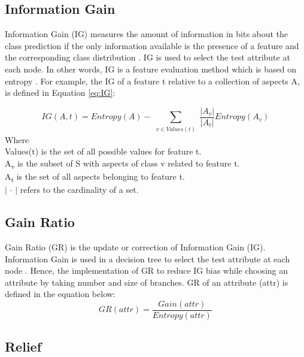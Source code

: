 \documentclass[review]{elsarticle}
\begin{document}
\subsection{Information Gain}
\label{subsec:IG}
Information Gain (IG) measures the amount of information in bits about the class prediction if the only information available is the presence of a feature and the corresponding class distribution \cite{Roobaert}. IG is used to select the test attribute at each node. In other words, IG is a feature evaluation method which is based on entropy \cite{Lei2012}. For example, the IG of a feature t relative to a collection of aspects A, is defined in Equation \ref{eq:IG}: 

\begin{equation}
IG(A,t)=Entropy(A) - \sum_{\substack{v\in Values(t)}} \dfrac{|A_v|}{|A_t|} Entropy(A_v)
\label{eq:IG}
\end{equation}
Where\\
 Values(t) is the set of all possible values for feature t. \\
 A\textsubscript{v} is the subset of S with aspects of class v related to feature t.\\
 A\textsubscript{t} is the set of all aspects belonging to feature t.\\
$\vert$ $\cdot$ $\vert$ refers to the cardinality of a set.

 
\subsection{Gain Ratio}
\label{subsec:GR}
Gain Ratio (GR) is the update or correction of Information Gain (IG). Information Gain is used in a decision tree to select the test attribute at each node \cite{Han2012}. Hence, the implementation of GR to reduce IG bias while choosing an attribute by taking number and size of branches. GR of an attribute (attr) is defined in the equation below: 
 \begin{equation}
 GR(attr)=\dfrac{Gain(attr)}{Entropy(attr)}
 \label{eq:GR}
 \end{equation}
 
\subsection{Relief}
\label{subsec:Relief}
\end{document}
